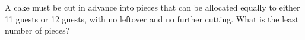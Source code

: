 A cake must be cut in advance into pieces that can be allocated equally to either 11 guests or 12 guests, with no leftover and no further cutting. What is the least number of pieces?
